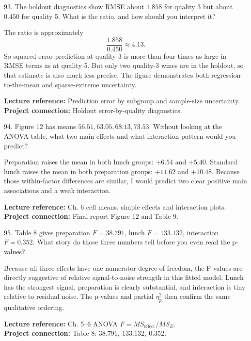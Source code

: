 \documentclass[10.5pt,a4paper]{article}
\newcommand{\chapref}[1]{\textbf{Lecture reference:} #1}
\newcommand{\projectref}[1]{\textbf{Project connection:} #1}
\begin{document}
\begin{qbox}{93. The holdout diagnostics show RMSE about \(1.858\) for quality 3 but about \(0.450\) for quality 5. What is the ratio, and how should you interpret it?}
\end{qbox}
\begin{answerbox}
The ratio is approximately
\[
\frac{1.858}{0.450}\approx4.13.
\]
So squared-error prediction at quality 3 is more than four times as large in RMSE terms as at quality 5. But only two quality-3 wines are in the holdout, so that estimate is also much less precise. The figure demonstrates both regression-to-the-mean and sparse-extreme uncertainty.
\end{answerbox}
\begin{refbox}\chapref{Prediction error by subgroup and sample-size uncertainty.}\\\projectref{Holdout error-by-quality diagnostics.}\end{refbox}

\begin{qbox}{94. Figure 12 has means \(56.51,63.05,68.13,73.53\). Without looking at the ANOVA table, what two main effects and what interaction pattern would you predict?}
\end{qbox}
\begin{answerbox}
Preparation raises the mean in both lunch groups: \(+6.54\) and \(+5.40\). Standard lunch raises the mean in both preparation groups: \(+11.62\) and \(+10.48\). Because those within-factor differences are similar, I would predict two clear positive main associations and a weak interaction.
\end{answerbox}
\begin{refbox}\chapref{Ch. 6 cell means, simple effects and interaction plots.}\\\projectref{Final report Figure 12 and Table 9.}\end{refbox}

\begin{qbox}{95. Table 8 gives preparation \(F=38.791\), lunch \(F=133.132\), interaction \(F=0.352\). What story do those three numbers tell before you even read the p-values?}
\end{qbox}
\begin{answerbox}
Because all three effects have one numerator degree of freedom, the F values are directly suggestive of relative signal-to-noise strength in this fitted model. Lunch has the strongest signal, preparation is clearly substantial, and interaction is tiny relative to residual noise. The p-values and partial \(\eta_p^2\) then confirm the same qualitative ordering.
\end{answerbox}
\begin{refbox}\chapref{Ch. 5--6 ANOVA \(F=MS_{\text{effect}}/MS_E\).}\\\projectref{Table 8: \(38.791,\ 133.132,\ 0.352\).}\end{refbox}
\end{document}
